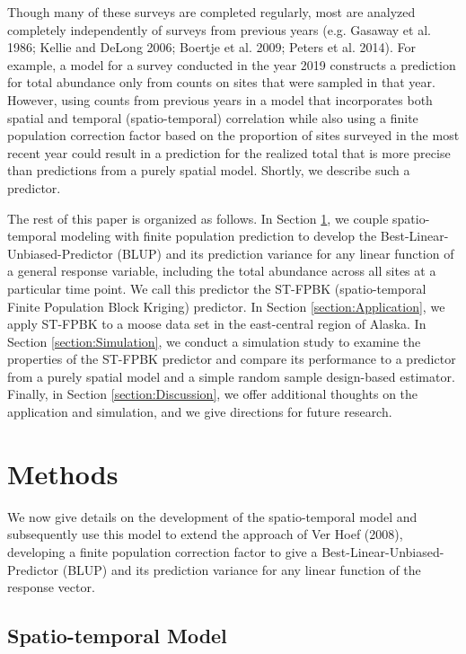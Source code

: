\documentclass[smallextended]{svjour3}       %
\begin{document}
Though many of these surveys are completed regularly, most are analyzed
completely independently of surveys from previous years (e.g. Gasaway et
al. 1986; Kellie and DeLong 2006; Boertje et al. 2009; Peters et al.
2014). For example, a model for a survey conducted in the year 2019
constructs a prediction for total abundance only from counts on sites
that were sampled in that year. However, using counts from previous
years in a model that incorporates both spatial and temporal
(spatio-temporal) correlation while also using a finite population
correction factor based on the proportion of sites surveyed in the most
recent year could result in a prediction for the realized total that is
more precise than predictions from a purely spatial model. Shortly, we
describe such a predictor.

The rest of this paper is organized as follows. In Section
\ref{section:Methods}, we couple spatio-temporal modeling with finite
population prediction to develop the Best-Linear-Unbiased-Predictor
(BLUP) and its prediction variance for any linear function of a general
response variable, including the total abundance across all sites at a
particular time point. We call this predictor the ST-FPBK
(spatio-temporal Finite Population Block Kriging) predictor. In Section
\ref{section:Application}, we apply ST-FPBK to a moose data set in the
east-central region of Alaska. In Section \ref{section:Simulation}, we
conduct a simulation study to examine the properties of the ST-FPBK
predictor and compare its performance to a predictor from a purely
spatial model and a simple random sample design-based estimator.
Finally, in Section \ref{section:Discussion}, we offer additional
thoughts on the application and simulation, and we give directions for
future research.

\hypertarget{section:Methods}{%
\section{Methods}\label{section:Methods}}

We now give details on the development of the spatio-temporal model and
subsequently use this model to extend the approach of Ver Hoef (2008),
developing a finite population correction factor to give a
Best-Linear-Unbiased-Predictor (BLUP) and its prediction variance for
any linear function of the response vector.

\hypertarget{spatio-temporal-model}{%
\subsection{Spatio-temporal Model}\label{spatio-temporal-model}}
\end{document}
